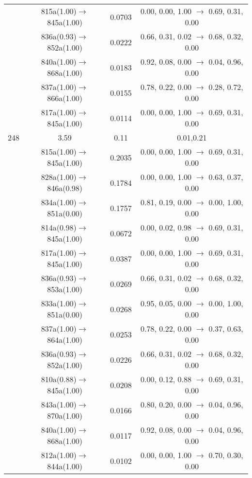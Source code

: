 \documentclass[10pt,a4paper]{article}
\begin{document}
\begin{longtable}{c|c|c|c}
 	& 815a(1.00)$\rightarrow$845a(1.00) &	 0.0703 &	 0.00, 0.00, 1.00 $\rightarrow$ 0.69, 0.31, 0.00 \\ 
 	& 836a(0.93)$\rightarrow$852a(1.00) &	 0.0222 &	 0.66, 0.31, 0.02 $\rightarrow$ 0.68, 0.32, 0.00 \\ 
 	& 840a(1.00)$\rightarrow$868a(1.00) &	 0.0183 &	 0.92, 0.08, 0.00 $\rightarrow$ 0.04, 0.96, 0.00 \\ 
 	& 837a(1.00)$\rightarrow$866a(1.00) &	 0.0155 &	 0.78, 0.22, 0.00 $\rightarrow$ 0.28, 0.72, 0.00 \\ 
 	& 817a(1.00)$\rightarrow$845a(1.00) &	 0.0114 &	 0.00, 0.00, 1.00 $\rightarrow$ 0.69, 0.31, 0.00 \\ 
 \hline248 &	 3.59 &	 0.11 &	 0.01,0.21 \\ 
  	& 815a(1.00)$\rightarrow$845a(1.00) &	 0.2035 &	 0.00, 0.00, 1.00 $\rightarrow$ 0.69, 0.31, 0.00 \\ 
 	& 828a(1.00)$\rightarrow$846a(0.98) &	 0.1784 &	 0.00, 0.00, 1.00 $\rightarrow$ 0.63, 0.37, 0.00 \\ 
 	& 834a(1.00)$\rightarrow$851a(0.00) &	 0.1757 &	 0.81, 0.19, 0.00 $\rightarrow$ 0.00, 1.00, 0.00 \\ 
 	& 814a(0.98)$\rightarrow$845a(1.00) &	 0.0672 &	 0.00, 0.02, 0.98 $\rightarrow$ 0.69, 0.31, 0.00 \\ 
 	& 817a(1.00)$\rightarrow$845a(1.00) &	 0.0387 &	 0.00, 0.00, 1.00 $\rightarrow$ 0.69, 0.31, 0.00 \\ 
 	& 836a(0.93)$\rightarrow$853a(1.00) &	 0.0269 &	 0.66, 0.31, 0.02 $\rightarrow$ 0.68, 0.32, 0.00 \\ 
 	& 833a(1.00)$\rightarrow$851a(0.00) &	 0.0268 &	 0.95, 0.05, 0.00 $\rightarrow$ 0.00, 1.00, 0.00 \\ 
 	& 837a(1.00)$\rightarrow$864a(1.00) &	 0.0253 &	 0.78, 0.22, 0.00 $\rightarrow$ 0.37, 0.63, 0.00 \\ 
 	& 836a(0.93)$\rightarrow$852a(1.00) &	 0.0226 &	 0.66, 0.31, 0.02 $\rightarrow$ 0.68, 0.32, 0.00 \\ 
 	& 810a(0.88)$\rightarrow$845a(1.00) &	 0.0208 &	 0.00, 0.12, 0.88 $\rightarrow$ 0.69, 0.31, 0.00 \\ 
 	& 843a(1.00)$\rightarrow$870a(1.00) &	 0.0166 &	 0.80, 0.20, 0.00 $\rightarrow$ 0.04, 0.96, 0.00 \\ 
 	& 840a(1.00)$\rightarrow$868a(1.00) &	 0.0117 &	 0.92, 0.08, 0.00 $\rightarrow$ 0.04, 0.96, 0.00 \\ 
 	& 812a(1.00)$\rightarrow$844a(1.00) &	 0.0102 &	 0.00, 0.00, 1.00 $\rightarrow$ 0.70, 0.30, 0.00 \\ 

\end{longtable}
\end{document}

